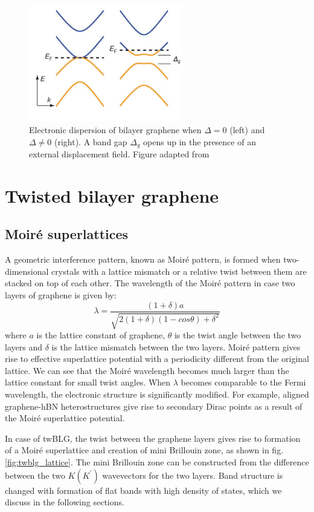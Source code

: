 \begin{figure}[H]
	\centering
	\includegraphics[width=0.6\textwidth]{figures/bilayer_dispersion.jpg}
	\caption{Electronic dispersion of bilayer graphene when $\Delta=0$ (left) and $\Delta\neq0$ (right). A band gap $\Delta_g$ opens up in the presence of an external displacement field. Figure adapted from \cite{Zhang2009}}
	\label{fig:bilayer_dispersion}
\end{figure}

\section{Twisted bilayer graphene}
\subsection{Moiré superlattices}
A geometric interference pattern, known as Moiré pattern, is formed when two-dimensional crystals with a lattice mismatch or a relative twist between them are stacked on top of each other. The wavelength of the Moiré pattern in case two layers of graphene is given by:
\begin{equation}
	\lambda = \frac{(1+\delta)a}{\sqrt{2(1+\delta)(1-cos\theta)+\delta^2}}
\end{equation}
where $a$ is the lattice constant of graphene, $\theta$ is the twist angle between the two layers and $\delta$ is the lattice mismatch between the two layers. Moiré pattern gives rise to effective superlattice potential with a periodicity different from the original lattice. We can see that the Moiré wavelength becomes much larger than the lattice constant for small twist angles. When $\lambda$ becomes comparable to the Fermi wavelength, the electronic structure is significantly modified. For example, aligned graphene-hBN heterostructures give rise to secondary Dirac points as a result of the Moiré superlattice potential.

In case of twBLG, the twist between the graphene layers gives rise to formation of a Moiré superlattice and creation of mini Brillouin zone, as shown in fig. \ref{fig:twblg_lattice}. The mini Brillouin zone can be constructed from the difference between the two $K(K^\prime)$ wavevectors for the two layers. Band structure is changed with formation of flat bands with high density of states, which we discuss in the following sections.

